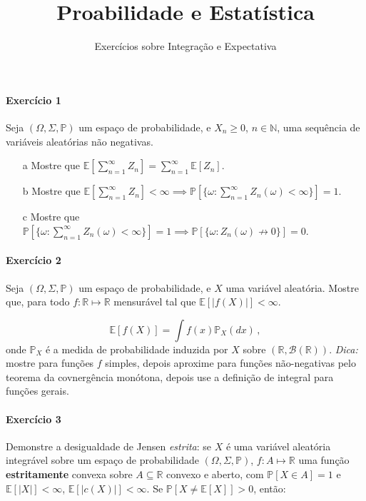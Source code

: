 \documentclass[10pt,a4paper]{article}
\title{\large Proabilidade e Estatística}
\author{\normalsize Exercícios sobre Integração e Expectativa}
\date{}
\begin{document}
	\maketitle
	\paragraph{Exercício 1} Seja $(\Omega, \Sigma, \mathbb{P})$ um espaço de probabilidade, e $X_n\geq0$, $n \in \mathbb{N}$, uma sequência de variáveis aleatórias não negativas.
	
	\begin{itemize}
		\item[a] Mostre que $\mathbb{E}[\sum_{n=1}^\infty Z_n] = \sum_{n=1}^\infty \mathbb{E}[Z_n]$.
		\item[b] Mostre que $\mathbb{E}[\sum_{n=1}^\infty Z_n] < \infty \implies \mathbb{P}[\{\omega:\sum_{n=1}^\infty Z_n(\omega) <\infty \}] = 1$.
		\item[c] Mostre que $\mathbb{P}[\{\omega:\sum_{n=1}^\infty Z_n(\omega) <\infty \}] = 1 \implies \mathbb{P}[\{\omega: Z_n(\omega)\nrightarrow 0\}] = 0$.
\end{itemize}

\paragraph{Exercício 2} Seja $(\Omega, \Sigma,\mathbb{P})$ um espaço de probabilidade, e $X$ uma variável aleatória. Mostre que, para todo $f: \mathbb{R} \mapsto \mathbb{R}$ mensurável tal que $\mathbb{E}[|f(X)|]<\infty$.

$$\mathbb{E}[f(X)] = \int f(x) \mathbb{P}_X(dx)\,, $$
onde $\mathbb{P}_X$ é a medida de probabilidade induzida por $X$ sobre $(\mathbb{R}, \mathcal{B}(\mathbb{R}))$. \textit{Dica:} mostre para funções $f$ simples, depois aproxime para funções não-negativas pelo teorema da covnergência monótona, depois use a definição de integral para funções gerais.

\paragraph{Exercício 3} Demonstre a desigualdade de Jensen \emph{estrita}: se $X$ é uma variável aleatória integrável sobre um espaço de probabilidade $(\Omega,\Sigma,\mathbb{P})$, $f: A \mapsto \mathbb{R}$ uma função \textbf{estritamente} convexa sobre $A \subseteq \mathbb{R}$ convexo e aberto, com $\mathbb{P}[X\in A] = 1$ e $\mathbb{E}[|X|]<\infty$, $\mathbb{E}[|c(X)|]<\infty$. Se $\mathbb{P}[X \neq \mathbb{E}[X]] > 0$, então:
\end{document}
